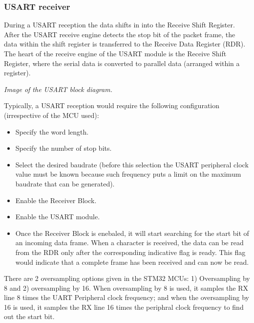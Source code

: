\documentclass[
a4paper, %
11pt, %
onecolumn, %
openany, %
]{memoir}
\begin{document}
\subsubsection{USART receiver}
During a USART reception the data shifts in into the Receive Shift Register. After the USART receive engine detects the stop bit of the packet frame, the data within the shift register is transferred to the Receive Data Register (RDR). The heart of the receive engine of the USART module is the Receive Shift Register, where the serial data is converted to parallel data (arranged within a register).

\begin{center}
\textit{Image of the USART block diagram.}
\end{center}

\noindent Typically, a USART reception would require the following configuration (irrespective of the MCU used):

\begin{itemize}
	\item	Specify the word length.
	\item	Specify the number of stop bits.
	\item	Select the desired baudrate (before this selection the USART peripheral clock value must be known because such frequency puts a limit on the maximum baudrate that can be generated).
	\item	Enable the Receiver Block.
	\item	Enable the USART module.
	\item	Once the Receiver Block is enebaled, it will start searching for the start bit of an incoming data frame. When a character is received, the data can be read from the RDR only after the corresponding indicative flag is ready. This flag would indicate that a complete frame has been received and can now be read.
\end{itemize}

\noindent There are 2 oversampling options given in the STM32 MCUs: 1) Oversampling by 8 and 2) oversampling by 16. When oversampling by 8 is used, it samples the RX line 8 times the UART Peripheral clock frequency; and when the oversampling by 16 is used, it samples the RX line 16 times the periphral clock frequency to find out the start bit.


\mainmatter










% 
% 
\end{document}
